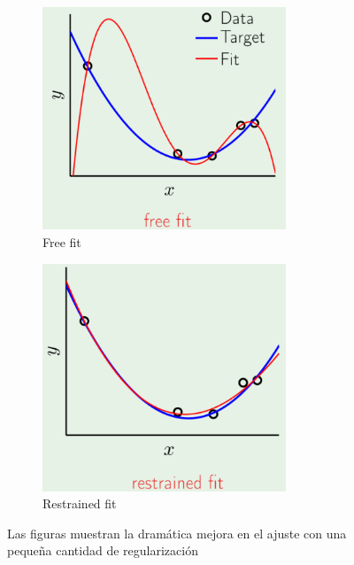 \documentclass[11pt,a4paper]{article}
\theoremstyle{definition}
\begin{document}
	\begin{figure}[H]
		\centering
		\begin{subfigure}{.5\textwidth}
  		\centering
  		\includegraphics[width=0.8\textwidth]{images/free_fit}
  		\caption{Free fit}
  		\label{fig:sub1}
		\end{subfigure}%
		\begin{subfigure}{.5\textwidth}
  		\centering
  		\includegraphics[width=0.8\textwidth]{images/restrained_fit}
  		\caption{Restrained fit}
  		\label{fig:sub2}
		\end{subfigure}
		\caption{Las figuras muestran la dramática mejora en el ajuste con una pequeña cantidad de regularización}
		\label{fig:test}
	\end{figure}
	
\end{document}

